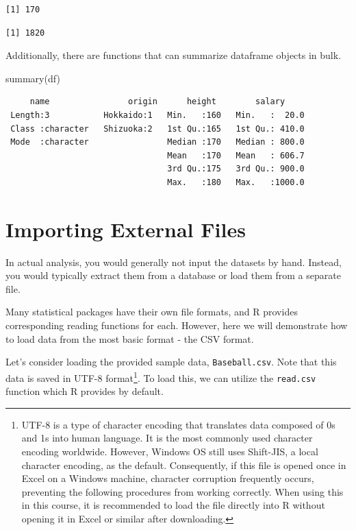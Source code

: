 \documentclass[
  a4paper,
]{book}
\newenvironment{Shaded}{\begin{snugshade}}{\end{snugshade}}
\newcommand{\FunctionTok}[1]{\textcolor[rgb]{0.28,0.35,0.67}{#1}}
\newcommand{\NormalTok}[1]{\textcolor[rgb]{0.00,0.23,0.31}{#1}}
\newcommand{\SpecialCharTok}[1]{\textcolor[rgb]{0.37,0.37,0.37}{#1}}
\begin{document}
\begin{verbatim}
[1] 170
\end{verbatim}

\begin{Shaded}
\end{Shaded}

\begin{verbatim}
[1] 1820
\end{verbatim}

Additionally, there are functions that can summarize dataframe objects
in bulk.

\begin{Shaded}
\begin{Highlighting}[]
\FunctionTok{summary}\NormalTok{(df)}
\end{Highlighting}
\end{Shaded}

\begin{verbatim}
     name                origin      height        salary      
 Length:3           Hokkaido:1   Min.   :160   Min.   :  20.0  
 Class :character   Shizuoka:2   1st Qu.:165   1st Qu.: 410.0  
 Mode  :character                Median :170   Median : 800.0  
                                 Mean   :170   Mean   : 606.7  
                                 3rd Qu.:175   3rd Qu.: 900.0  
                                 Max.   :180   Max.   :1000.0  
\end{verbatim}

\section{Importing External Files}\label{importing-external-files}

In actual analysis, you would generally not input the datasets by hand.
Instead, you would typically extract them from a database or load them
from a separate file.

Many statistical packages have their own file formats, and R provides
corresponding reading functions for each. However, here we will
demonstrate how to load data from the most basic format - the CSV
format.

Let's consider loading the provided sample data, \texttt{Baseball.csv}.
Note that this data is saved in UTF-8 format\footnote{UTF-8 is a type of
  character encoding that translates data composed of 0s and 1s into
  human language. It is the most commonly used character encoding
  worldwide. However, Windows OS still uses Shift-JIS, a local character
  encoding, as the default. Consequently, if this file is opened once in
  Excel on a Windows machine, character corruption frequently occurs,
  preventing the following procedures from working correctly. When using
  this in this course, it is recommended to load the file directly into
  R without opening it in Excel or similar after downloading.}. To load
this, we can utilize the \texttt{read.csv} function which R provides by
default.
\end{document}
